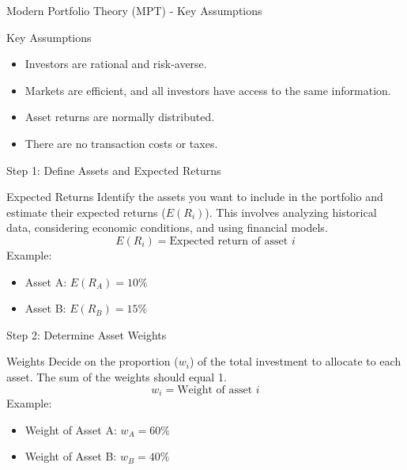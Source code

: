\documentclass{beamer}
\begin{document}
\begin{frame}{Modern Portfolio Theory (MPT) - Key Assumptions}
  \begin{block}{Key Assumptions}
    \begin{itemize}
      \item Investors are rational and risk-averse.
      \item Markets are efficient, and all investors have access to the same information.
      \item Asset returns are normally distributed.
      \item There are no transaction costs or taxes.
    \end{itemize}
  \end{block}
\end{frame}

\begin{frame}{Step 1: Define Assets and Expected Returns}
  \begin{block}{Expected Returns}
    Identify the assets you want to include in the portfolio and estimate their expected returns (\(E(R_i)\)). This involves analyzing historical data, considering economic conditions, and using financial models.
    \begin{equation*}
      E(R_i) = \text{Expected return of asset } i
    \end{equation*}
    Example: 
    \begin{itemize}
      \item Asset A: \(E(R_A) = 10\%\)
      \item Asset B: \(E(R_B) = 15\%\)
    \end{itemize}
  \end{block}
\end{frame}

\begin{frame}{Step 2: Determine Asset Weights}
  \begin{block}{Weights}
    Decide on the proportion (\(w_i\)) of the total investment to allocate to each asset. The sum of the weights should equal 1.
    \begin{equation*}
      w_i = \text{Weight of asset } i
    \end{equation*}
    Example:
    \begin{itemize}
      \item Weight of Asset A: \(w_A = 60\%\)
      \item Weight of Asset B: \(w_B = 40\%\)
    \end{itemize}
  \end{block}
\end{frame}
\end{document}
